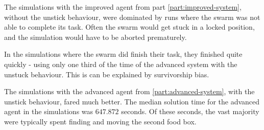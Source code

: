 \documentclass[a4paper]{article}
\begin{document}
The simulations with the improved agent from part \ref{part:improved-system}, without the unstick behaviour, were dominated by runs where the swarm was not able to complete its task.
Often the swarm would get stuck in a locked position, and the simulation would have to be aborted prematurely.

In the simulations where the swarm did finish their task, they finished quite quickly - using only one third of the time of the advanced system with the unstuck behaviour.
This is can be explained by survivorship bias.

The simulations with the advanced agent from \ref{part:advanced-system}, with the unstick behaviour, fared much better.
The median solution time for the advanced agent in the simulations was $ 647.872 $ seconds.
Of these seconds, the vast majority were typically spent finding and moving the second food box.



\newpage
{}


\end{document}
